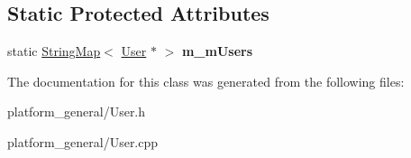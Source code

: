 \subsection*{\-Static \-Protected \-Attributes}
\begin{DoxyCompactItemize}
\item 
\hypertarget{classgeneral__server_1_1User_a9ed3148804033dc0791075bdec8742ea}{static \hyperlink{classgeneral__server_1_1StringMap}{\-String\-Map}$<$ \hyperlink{classgeneral__server_1_1User}{\-User} $\ast$ $>$ {\bfseries m\-\_\-m\-Users}}\label{classgeneral__server_1_1User_a9ed3148804033dc0791075bdec8742ea}

\end{DoxyCompactItemize}


\-The documentation for this class was generated from the following files\-:\begin{DoxyCompactItemize}
\item 
platform\-\_\-general/\-User.\-h\item 
platform\-\_\-general/\-User.\-cpp\end{DoxyCompactItemize}
